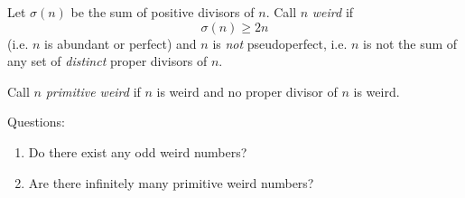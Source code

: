 Let $\sigma(n)$ be the sum of positive divisors of $n$. Call $n$ \emph{weird} if
\[
\sigma(n)\ge 2n
\]
(i.e. $n$ is abundant or perfect) and $n$ is \emph{not} pseudoperfect, i.e. $n$ is not the sum of any set of \emph{distinct} proper divisors of $n$.

Call $n$ \emph{primitive weird} if $n$ is weird and no proper divisor of $n$ is weird.

Questions:
\begin{enumerate}
\item Do there exist any odd weird numbers?
\item Are there infinitely many primitive weird numbers?
\end{enumerate}
